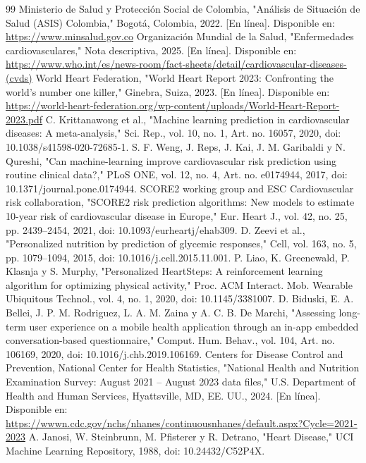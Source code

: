 \documentclass[conference]{IEEEtran}
\begin{document}
\begin{thebibliography}{99}
 Ministerio de Salud y Protección Social de Colombia, "Análisis de Situación de Salud (ASIS) Colombia," Bogotá, Colombia, 2022. [En línea]. Disponible en: \url{https://www.minsalud.gov.co}
 Organización Mundial de la Salud, "Enfermedades cardiovasculares," Nota descriptiva, 2025. [En línea]. Disponible en: \url{https://www.who.int/es/news-room/fact-sheets/detail/cardiovascular-diseases-(cvds)}
 World Heart Federation, "World Heart Report 2023: Confronting the world's number one killer," Ginebra, Suiza, 2023. [En línea]. Disponible en: \url{https://world-heart-federation.org/wp-content/uploads/World-Heart-Report-2023.pdf}
 C. Krittanawong et al., "Machine learning prediction in cardiovascular diseases: A meta-analysis," Sci. Rep., vol. 10, no. 1, Art. no. 16057, 2020, doi: 10.1038/s41598-020-72685-1.
 S. F. Weng, J. Reps, J. Kai, J. M. Garibaldi y N. Qureshi, "Can machine-learning improve cardiovascular risk prediction using routine clinical data?," PLoS ONE, vol. 12, no. 4, Art. no. e0174944, 2017, doi: 10.1371/journal.pone.0174944.
 SCORE2 working group and ESC Cardiovascular risk collaboration, "SCORE2 risk prediction algorithms: New models to estimate 10-year risk of cardiovascular disease in Europe," Eur. Heart J., vol. 42, no. 25, pp. 2439–2454, 2021, doi: 10.1093/eurheartj/ehab309.
 D. Zeevi et al., "Personalized nutrition by prediction of glycemic responses," Cell, vol. 163, no. 5, pp. 1079–1094, 2015, doi: 10.1016/j.cell.2015.11.001.
 P. Liao, K. Greenewald, P. Klasnja y S. Murphy, "Personalized HeartSteps: A reinforcement learning algorithm for optimizing physical activity," Proc. ACM Interact. Mob. Wearable Ubiquitous Technol., vol. 4, no. 1, 2020, doi: 10.1145/3381007.
 D. Biduski, E. A. Bellei, J. P. M. Rodriguez, L. A. M. Zaina y A. C. B. De Marchi, "Assessing long-term user experience on a mobile health application through an in-app embedded conversation-based questionnaire," Comput. Hum. Behav., vol. 104, Art. no. 106169, 2020, doi: 10.1016/j.chb.2019.106169.
 Centers for Disease Control and Prevention, National Center for Health Statistics, "National Health and Nutrition Examination Survey: August 2021 – August 2023 data files," U.S. Department of Health and Human Services, Hyattsville, MD, EE. UU., 2024. [En línea]. Disponible en: \url{https://wwwn.cdc.gov/nchs/nhanes/continuousnhanes/default.aspx?Cycle=2021-2023}
 A. Janosi, W. Steinbrunn, M. Pfisterer y R. Detrano, "Heart Disease," UCI Machine Learning Repository, 1988, doi: 10.24432/C52P4X.

\end{thebibliography}
\end{document}
